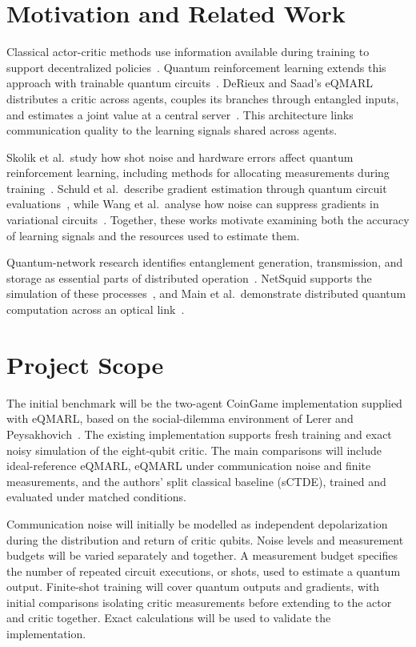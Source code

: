 \documentclass[12pt]{article}
\begin{document}
\section{Motivation and Related Work}

Classical actor-critic methods use information available during training to support decentralized policies~\cite{lowe}. Quantum reinforcement learning extends this approach with trainable quantum circuits~\cite{jerbi}. DeRieux and Saad's eQMARL distributes a critic across agents, couples its branches through entangled inputs, and estimates a joint value at a central server~\cite{eqmarl}. This architecture links communication quality to the learning signals shared across agents.

Skolik et al.\ study how shot noise and hardware errors affect quantum reinforcement learning, including methods for allocating measurements during training~\cite{skolik}. Schuld et al.\ describe gradient estimation through quantum circuit evaluations~\cite{schuld}, while Wang et al.\ analyse how noise can suppress gradients in variational circuits~\cite{wang}. Together, these works motivate examining both the accuracy of learning signals and the resources used to estimate them.

Quantum-network research identifies entanglement generation, transmission, and storage as essential parts of distributed operation~\cite{wehner}. NetSquid supports the simulation of these processes~\cite{netsquid}, and Main et al.\ demonstrate distributed quantum computation across an optical link~\cite{main}.

\newpage
\section{Project Scope}

The initial benchmark will be the two-agent CoinGame implementation supplied with eQMARL, based on the social-dilemma environment of Lerer and Peysakhovich~\cite{lerer}. The existing implementation supports fresh training and exact noisy simulation of the eight-qubit critic. The main comparisons will include ideal-reference eQMARL, eQMARL under communication noise and finite measurements, and the authors' split classical baseline (sCTDE), trained and evaluated under matched conditions.

Communication noise will initially be modelled as independent depolarization during the distribution and return of critic qubits. Noise levels and measurement budgets will be varied separately and together. A measurement budget specifies the number of repeated circuit executions, or shots, used to estimate a quantum output. Finite-shot training will cover quantum outputs and gradients, with initial comparisons isolating critic measurements before extending to the actor and critic together. Exact calculations will be used to validate the implementation.
\end{document}
